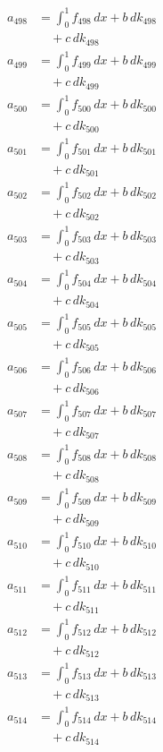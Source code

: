 \documentclass{article}
\begin{document}
\begin{align}
a_{498} &= \int_0^1 f_{498}\,dx + b\,dk_{498} \\
&\quad + c\,dk_{498} \\
a_{499} &= \int_0^1 f_{499}\,dx + b\,dk_{499} \\
&\quad + c\,dk_{499} \\
a_{500} &= \int_0^1 f_{500}\,dx + b\,dk_{500} \\
&\quad + c\,dk_{500} \\
a_{501} &= \int_0^1 f_{501}\,dx + b\,dk_{501} \\
&\quad + c\,dk_{501} \\
a_{502} &= \int_0^1 f_{502}\,dx + b\,dk_{502} \\
&\quad + c\,dk_{502} \\
a_{503} &= \int_0^1 f_{503}\,dx + b\,dk_{503} \\
&\quad + c\,dk_{503} \\
a_{504} &= \int_0^1 f_{504}\,dx + b\,dk_{504} \\
&\quad + c\,dk_{504} \\
a_{505} &= \int_0^1 f_{505}\,dx + b\,dk_{505} \\
&\quad + c\,dk_{505} \\
a_{506} &= \int_0^1 f_{506}\,dx + b\,dk_{506} \\
&\quad + c\,dk_{506} \\
a_{507} &= \int_0^1 f_{507}\,dx + b\,dk_{507} \\
&\quad + c\,dk_{507} \\
a_{508} &= \int_0^1 f_{508}\,dx + b\,dk_{508} \\
&\quad + c\,dk_{508} \\
a_{509} &= \int_0^1 f_{509}\,dx + b\,dk_{509} \\
&\quad + c\,dk_{509} \\
a_{510} &= \int_0^1 f_{510}\,dx + b\,dk_{510} \\
&\quad + c\,dk_{510} \\
a_{511} &= \int_0^1 f_{511}\,dx + b\,dk_{511} \\
&\quad + c\,dk_{511} \\
a_{512} &= \int_0^1 f_{512}\,dx + b\,dk_{512} \\
&\quad + c\,dk_{512} \\
a_{513} &= \int_0^1 f_{513}\,dx + b\,dk_{513} \\
&\quad + c\,dk_{513} \\
a_{514} &= \int_0^1 f_{514}\,dx + b\,dk_{514} \\
&\quad + c\,dk_{514} \\

\end{align}
\end{document}
